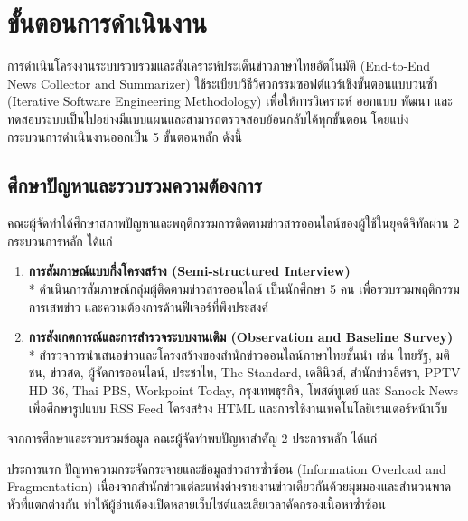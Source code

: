 
\section{ขั้นตอนการดำเนินงาน}

การดำเนินโครงงานระบบรวบรวมและสังเคราะห์ประเด็นข่าวภาษาไทยอัตโนมัติ (End-to-End News Collector and Summarizer) ใช้ระเบียบวิธีวิศวกรรมซอฟต์แวร์เชิงขั้นตอนแบบวนซ้ำ (Iterative Software Engineering Methodology) เพื่อให้การวิเคราะห์ ออกแบบ พัฒนา และทดสอบระบบเป็นไปอย่างมีแบบแผนและสามารถตรวจสอบย้อนกลับได้ทุกขั้นตอน โดยแบ่งกระบวนการดำเนินงานออกเป็น 5 ขั้นตอนหลัก ดังนี้

\subsection{ศึกษาปัญหาและรวบรวมความต้องการ}

คณะผู้จัดทำได้ศึกษาสภาพปัญหาและพฤติกรรมการติดตามข่าวสารออนไลน์ของผู้ใช้ในยุคดิจิทัลผ่าน 2 กระบวนการหลัก ได้แก่

\begin{enumerate}
    \item \textbf{การสัมภาษณ์แบบกึ่งโครงสร้าง (Semi-structured Interview)}\\*
    ดำเนินการสัมภาษณ์กลุ่มผู้ติดตามข่าวสารออนไลน์ เป็นนักศึกษา 5 คน เพื่อรวบรวมพฤติกรรมการเสพข่าว และความต้องการด้านฟีเจอร์ที่พึงประสงค์
    \item \textbf{การสังเกตการณ์และการสำรวจระบบงานเดิม (Observation and Baseline Survey)}\\*
    สำรวจการนำเสนอข่าวและโครงสร้างของสำนักข่าวออนไลน์ภาษาไทยชั้นนำ เช่น ไทยรัฐ, มติชน, ข่าวสด, ผู้จัดการออนไลน์, ประชาไท, The Standard, เดลินิวส์, สำนักข่าวอิศรา, PPTV HD 36, Thai PBS, Workpoint Today, กรุงเทพธุรกิจ, โพสต์ทูเดย์ และ Sanook News เพื่อศึกษารูปแบบ RSS Feed โครงสร้าง HTML และการใช้งานเทคโนโลยีเรนเดอร์หน้าเว็บ
\end{enumerate}

จากการศึกษาและรวบรวมข้อมูล คณะผู้จัดทำพบปัญหาสำคัญ 2 ประการหลัก ได้แก่

ประการแรก ปัญหาความกระจัดกระจายและข้อมูลข่าวสารซ้ำซ้อน (Information Overload and Fragmentation) เนื่องจากสำนักข่าวแต่ละแห่งต่างรายงานข่าวเดียวกันด้วยมุมมองและสำนวนพาดหัวที่แตกต่างกัน ทำให้ผู้อ่านต้องเปิดหลายเว็บไซต์และเสียเวลาคัดกรองเนื้อหาซ้ำซ้อน

